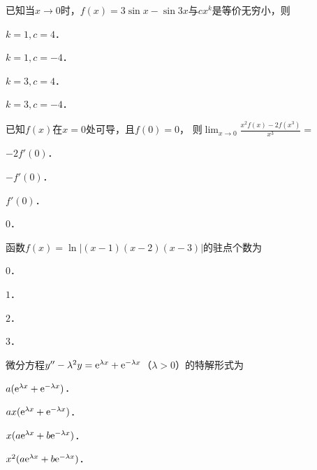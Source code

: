 \documentclass[plain,noanswer,medmath]{../../template/jnuexam}
\begin{document}






\begin{problem}
已知当$x \to 0$时，$f(x) = 3\sin x - \sin 3x$与$cx^k$是等价无穷小，则\pickout{}
\begin{abcd}
\item $k = 1,c = 4$．
\item $k = 1,c = - 4$．
\item $k = 3,c = 4$．
\item $k = 3,c = - 4$．
\end{abcd}
\end{problem}


\begin{problem}
已知$f(x)$在$x = 0$处可导，且$f(0) = 0$，
则$\lim_{x \to 0} \frac{x^2 f(x) - 2f\left(x^3 \right)}{x^3} =$\pickout{}
\begin{abcd}
\item $- 2f'(0)$．
\item $- f'(0)$．
\item $f'(0)$．
\item $0$．
\end{abcd}
\end{problem}


\begin{problem}
函数$f(x) = \ln \left| (x - 1)(x - 2)(x - 3) \right|$的驻点个数为\pickout{}
\begin{abcd}
\item $0$．
\item $1$．
\item $2$．
\item $3$．
\end{abcd}
\end{problem}


\begin{problem}
微分方程$y'' - \lambda^2 y = \mathrm{e}^{\lambda x} + \mathrm{e}^{- \lambda x}$（$\lambda > 0$）的特解形式为\pickout{}
\begin{abcd}
\item $a(\mathrm{e}^{\lambda x} + \mathrm{e}^{- \lambda x})$．
\item $ax(\mathrm{e}^{\lambda x} + \mathrm{e}^{- \lambda x})$．
\item $x(a\mathrm{e}^{\lambda x} + b\mathrm{e}^{- \lambda x})$．
\item $x^2(a\mathrm{e}^{\lambda x} + b\mathrm{e}^{- \lambda x})$．
\end{abcd}
\end{problem}
\end{document}
